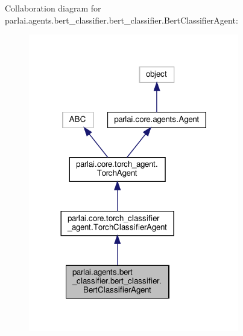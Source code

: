 Collaboration diagram for parlai.\+agents.\+bert\+\_\+classifier.\+bert\+\_\+classifier.\+Bert\+Classifier\+Agent\+:
\nopagebreak
\begin{figure}[H]
\begin{center}
\leavevmode
\includegraphics[width=260pt]{d0/d0e/classparlai_1_1agents_1_1bert__classifier_1_1bert__classifier_1_1BertClassifierAgent__coll__graph}
\end{center}
\end{figure}
